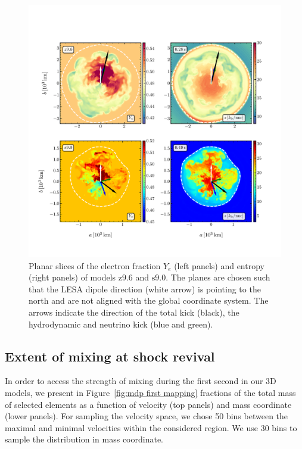 \documentclass[fleqn,usenatbib]{mnras}
\newcommand{\snine}{\ensuremath{\mathrm{s9.0}}\xspace}
\newcommand{\znine}{\ensuremath{\mathrm{z9.6}}\xspace}
\newcommand{\GEO}[1]{{\color{red}#1}}
\begin{document}
\begin{figure}
 \centering
 \includegraphics[width=\textwidth,trim=0cm 1.3cm 0cm 2cm,clip]{pic/z9_s9_3d_ye_sto_kick_slices_paper.pdf}
 \caption{\GEO{Planar slices of the electron fraction $Y_{e}$ (left panels) and entropy (right panels) of models \znine and \snine. The planes are chosen such that the LESA dipole direction (white arrow) is pointing to the north and are not aligned with the global coordinate system. The arrows indicate the direction of the total kick (black), the hydrodynamic and neutrino kick (blue and green).}}
 \label{fig:sto ye s9 z9 kick}
\end{figure}

\subsection{Extent of mixing at shock revival}
\label{sec:Extent of mixing at shock revival}

In order to access the strength of mixing during the first second in our 3D models, we present in Figure~\ref{fig:mdp first mapping} fractions of the total mass of selected elements as a function of velocity (top panels) and mass coordinate (lower panels). 
For sampling the velocity space, we chose 50 bins between the maximal and minimal velocities within the considered region. We use 30 bins to sample the distribution in mass coordinate.
\end{document}
